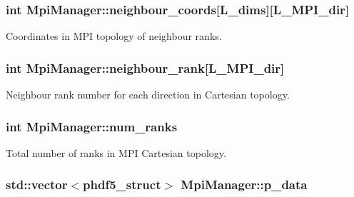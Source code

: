 \subsubsection[{\texorpdfstring{neighbour\+\_\+coords}{neighbour_coords}}]{\setlength{\rightskip}{0pt plus 5cm}int Mpi\+Manager\+::neighbour\+\_\+coords\mbox{[}{\bf L\+\_\+dims}\mbox{]}\mbox{[}{\bf L\+\_\+\+M\+P\+I\+\_\+dir}\mbox{]}}\hypertarget{class_mpi_manager_a6db3764ecc637f90afded1f783acb244}{}\label{class_mpi_manager_a6db3764ecc637f90afded1f783acb244}


Coordinates in M\+PI topology of neighbour ranks. 

\subsubsection[{\texorpdfstring{neighbour\+\_\+rank}{neighbour_rank}}]{\setlength{\rightskip}{0pt plus 5cm}int Mpi\+Manager\+::neighbour\+\_\+rank\mbox{[}{\bf L\+\_\+\+M\+P\+I\+\_\+dir}\mbox{]}}\hypertarget{class_mpi_manager_a3f3db562bc7ba8871180c5c9ac388c13}{}\label{class_mpi_manager_a3f3db562bc7ba8871180c5c9ac388c13}


Neighbour rank number for each direction in Cartesian topology. 

\subsubsection[{\texorpdfstring{num\+\_\+ranks}{num_ranks}}]{\setlength{\rightskip}{0pt plus 5cm}int Mpi\+Manager\+::num\+\_\+ranks\hspace{0.3cm}{\ttfamily [static]}}\hypertarget{class_mpi_manager_af5156a5e4519f43230b6b84792464e48}{}\label{class_mpi_manager_af5156a5e4519f43230b6b84792464e48}


Total number of ranks in M\+PI Cartesian topology. 

\subsubsection[{\texorpdfstring{p\+\_\+data}{p_data}}]{\setlength{\rightskip}{0pt plus 5cm}std\+::vector$<${\bf phdf5\+\_\+struct}$>$ Mpi\+Manager\+::p\+\_\+data}\hypertarget{class_mpi_manager_a03972530e718d5b0a7f119e9c6132179}{}\label{class_mpi_manager_a03972530e718d5b0a7f119e9c6132179}


